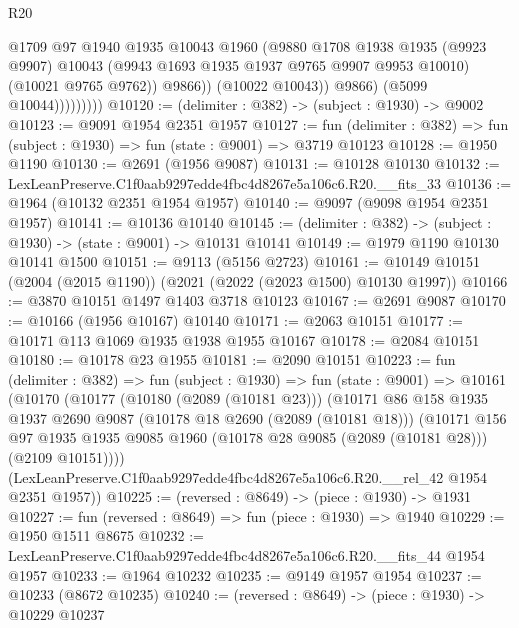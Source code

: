 \begin{lexlean}{R20}
\begin{coremodule}
                            @1709
                            @97
                            @1940
                            @1935
                            @10043
                            @1960
                            (@9880
                              @1708
                              @1938
                              @1935
                              (@9923 @9907)
                              @10043
                              (@9943 @1693 @1935 @1937 @9765 @9907 @9953 @10010)
                              (@10021 @9765 @9762))
                            @9866))
                        (@10022 @10043))
                      @9866)
                    (@5099 @10044)))))))))
@10120 := (delimiter : @382) -> (subject : @1930) -> @9002
@10123 := @9091 @1954 @2351 @1957
@10127 := fun (delimiter : @382) => fun (subject : @1930) => fun (state : @9001) => @3719 @10123
@10128 := @1950 @1190
@10130 := @2691 (@1956 @9087)
@10131 := @10128 @10130
@10132 := LexLeanPreserve.C1f0aab9297edde4fbc4d8267e5a106c6.R20.__fits_33
@10136 := @1964 (@10132 @2351 @1954 @1957)
@10140 := @9097 (@9098 @1954 @2351 @1957)
@10141 := @10136 @10140
@10145 := (delimiter : @382) -> (subject : @1930) -> (state : @9001) -> @10131 @10141
@10149 := @1979 @1190 @10130 @10141 @1500
@10151 := @9113 (@5156 @2723)
@10161 := @10149 @10151 (@2004 (@2015 @1190)) (@2021 (@2022 (@2023 @1500) @10130 @1997))
@10166 := @3870 @10151 @1497 @1403 @3718 @10123
@10167 := @2691 @9087
@10170 := @10166 (@1956 @10167) @10140
@10171 := @2063 @10151
@10177 := @10171 @113 @1069 @1935 @1938 @1955 @10167
@10178 := @2084 @10151
@10180 := @10178 @23 @1955
@10181 := @2090 @10151
@10223 := fun (delimiter : @382) =>
  fun (subject : @1930) =>
  fun (state : @9001) =>
  @10161
    (@10170
      (@10177
        (@10180 (@2089 (@10181 @23)))
        (@10171
          @86
          @158
          @1935
          @1937
          @2690
          @9087
          (@10178 @18 @2690 (@2089 (@10181 @18)))
          (@10171
            @156
            @97
            @1935
            @1935
            @9085
            @1960
            (@10178 @28 @9085 (@2089 (@10181 @28)))
            (@2109 @10151))))
      (LexLeanPreserve.C1f0aab9297edde4fbc4d8267e5a106c6.R20.__rel_42 @1954 @2351 @1957))
@10225 := (reversed : @8649) -> (piece : @1930) -> @1931
@10227 := fun (reversed : @8649) => fun (piece : @1930) => @1940
@10229 := @1950 @1511 @8675
@10232 := LexLeanPreserve.C1f0aab9297edde4fbc4d8267e5a106c6.R20.__fits_44 @1954 @1957
@10233 := @1964 @10232
@10235 := @9149 @1957 @1954
@10237 := @10233 (@8672 @10235)
@10240 := (reversed : @8649) -> (piece : @1930) -> @10229 @10237

\end{coremodule}
\end{lexlean}
